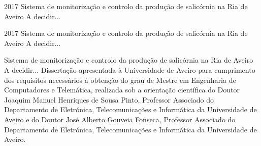 \documentclass[11pt,twoside,a4paper]{report}
\def\ThesisYear{2017}
\newcommand{\namethesispt}{Sistema de monitorização e controlo da produção de salicórnia na Ria de Aveiro}
\newcommand{\namethesisen}{A decidir...}
\begin{document}
%
%

\TitlePage
         {\ThesisYear}
        {\namethesispt
        \newline \newline
       	\namethesisen
    	}
\EndTitlePage
\titlepage\ \endtitlepage %

\TitlePage
  \HEADER{\BAR\FIG{\begin{minipage}{50mm} %
          \end{minipage}}}
         {\ThesisYear}
{\namethesispt
\newline \newline
\namethesisen}
\EndTitlePage
\titlepage\ \endtitlepage %


%
%

\TitlePage
  \HEADERSEM{}{\ThesisYear}
  {\namethesispt
  	\newline \newline
  	\namethesisen
  }
  \vspace*{15mm}
  \TEXT{}
       {Dissertação apresentada à Universidade de Aveiro para cumprimento dos requisitos necessários à obtenção do grau de Mestre em Engenharia de Computadores e Telemática, realizada sob a orientação científica do Doutor Joaquim Manuel Henriques de Sousa Pinto, Professor Associado do Departamento de Eletrónica, Telecomunicações e Informática da Universidade de Aveiro e do Doutor José Alberto Gouveia Fonseca, Professor Associado do Departamento de Eletrónica, Telecomunicações e Informática da Universidade de Aveiro. }
\EndTitlePage
\titlepage\ \endtitlepage %
\end{document}
